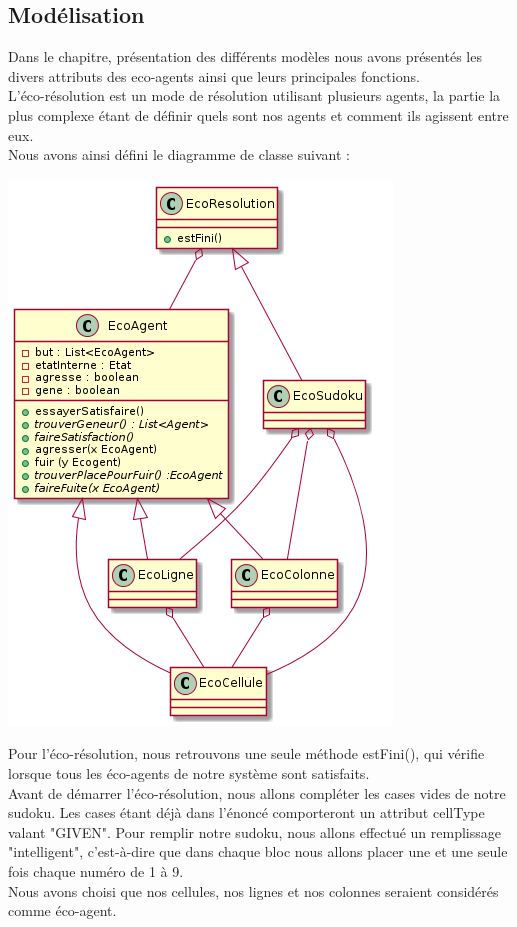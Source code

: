         \subsection{Modélisation}
            Dans le chapitre, présentation des différents modèles nous avons présentés les divers attributs des eco-agents ainsi que leurs principales fonctions. \\
            L'éco-résolution est un mode de résolution utilisant plusieurs agents, la partie la plus complexe étant de définir quels sont nos agents et comment ils agissent entre eux. \\
            Nous avons ainsi défini le diagramme de classe suivant : \\
            \begin{center}
                \includegraphics[scale=0.7]{diagrams/ecoResolution.png}
            \end{center} 

            Pour l'éco-résolution, nous retrouvons une seule méthode estFini(), qui vérifie lorsque tous les éco-agents de notre système sont satisfaits. \\
            Avant de démarrer l'éco-résolution, nous allons compléter les cases vides de notre sudoku. Les cases étant déjà dans l'énoncé comporteront un attribut cellType valant "GIVEN". Pour remplir notre sudoku, nous allons effectué un remplissage "intelligent", c'est-à-dire que dans chaque bloc nous allons placer une et une seule fois chaque numéro de 1 à 9.\\
            Nous avons choisi que nos cellules, nos lignes et nos colonnes seraient considérés comme éco-agent. \\
